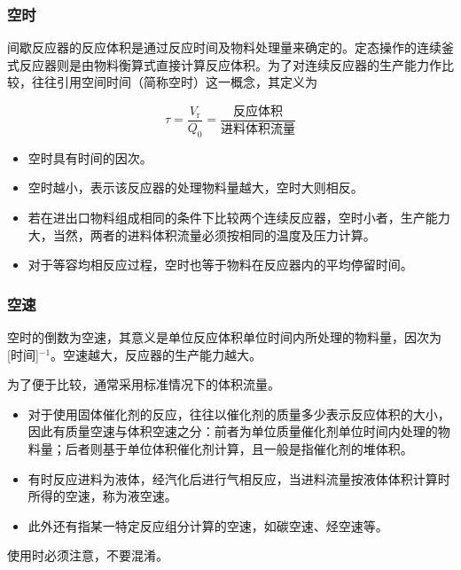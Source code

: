 \begin{frame}
    \frametitle{空时}

    间歇反应器的反应体积是通过反应时间及物料处理量来确定的。定态操作的连续釜式反应器则是由物料衡算式直接计算反应体积。为了对连续反应器的生产能力作比较，往往引用空间时间（简称空时）这一概念，其定义为
    
    \[\tau = \frac{V_\mathrm{r}}{Q_0} = \frac{\text{反应体积}}{\text{进料体积流量}}\]

    \begin{itemize}
        \item[\bullet] 空时具有时间的因次。
        \item[\bullet] 空时越小，表示该反应器的处理物料量越大，空时大则相反。
        \item[\bullet] 若在进出口物料组成相同的条件下比较两个连续反应器，空时小者，生产能力大，当然，两者的进料体积流量必须按相同的温度及压力计算。
        \item[\bullet] 对于等容均相反应过程，空时也等于物料在反应器内的平均停留时间。
    \end{itemize}


\end{frame}


\begin{frame}
    \frametitle{空速}

    空时的倒数为空速，其意义是单位反应体积单位时间内所处理的物料量，因次为[时间]$^{-1}$。空速越大，反应器的生产能力越大。

    为了便于比较，通常采用标准情况下的体积流量。
    \begin{itemize}
        \item[\bullet] 对于使用固体催化剂的反应，往往以催化剂的质量多少表示反应体积的大小，因此有质量空速与体积空速之分：前者为单位质量催化剂单位时间内处理的物料量；后者则基于单位体积催化剂计算，且一般是指催化剂的堆体积。

        \item[\bullet] 有时反应进料为液体，经汽化后进行气相反应，当进料流量按液体体积计算时所得的空速，称为液空速。

        \item[\bullet] 此外还有指某一特定反应组分计算的空速，如碳空速、烃空速等。
    \end{itemize}
    使用时必须注意，不要混淆。
\end{frame}


